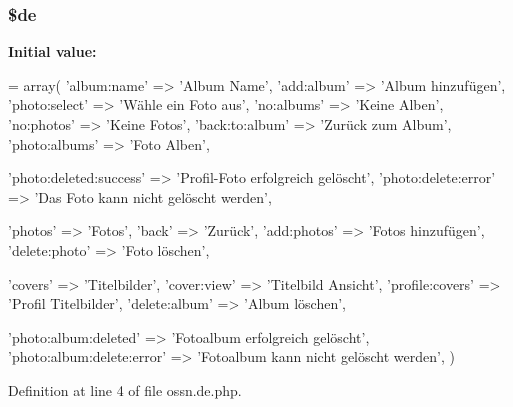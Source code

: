 \subsubsection[{\texorpdfstring{\$de}{$de}}]{\setlength{\rightskip}{0pt plus 5cm}\$de}\hypertarget{components_2_ossn_photos_2locale_2ossn_8de_8php_aab7de7e51b4580005f63dd4cf5e17311}{}\label{components_2_ossn_photos_2locale_2ossn_8de_8php_aab7de7e51b4580005f63dd4cf5e17311}
{\bfseries Initial value\+:}
\begin{DoxyCode}
= array(
    \textcolor{stringliteral}{'album:name'} => \textcolor{stringliteral}{'Album Name'},
    \textcolor{stringliteral}{'add:album'} => \textcolor{stringliteral}{'Album hinzufügen'},
    \textcolor{stringliteral}{'photo:select'} => \textcolor{stringliteral}{'Wähle ein Foto aus'},
    \textcolor{stringliteral}{'no:albums'} => \textcolor{stringliteral}{'Keine Alben'},
    \textcolor{stringliteral}{'no:photos'} => \textcolor{stringliteral}{'Keine Fotos'},
    \textcolor{stringliteral}{'back:to:album'} => \textcolor{stringliteral}{'Zurück zum Album'},
    \textcolor{stringliteral}{'photo:albums'} => \textcolor{stringliteral}{'Foto Alben'},
    
    \textcolor{stringliteral}{'photo:deleted:success'} => \textcolor{stringliteral}{'Profil-Foto erfolgreich gelöscht'},
    \textcolor{stringliteral}{'photo:delete:error'} => \textcolor{stringliteral}{'Das Foto kann nicht gelöscht werden'},
    
    \textcolor{stringliteral}{'photos'} => \textcolor{stringliteral}{'Fotos'},
    \textcolor{stringliteral}{'back'} => \textcolor{stringliteral}{'Zurück'},
    \textcolor{stringliteral}{'add:photos'} => \textcolor{stringliteral}{'Fotos hinzufügen'},
    \textcolor{stringliteral}{'delete:photo'} => \textcolor{stringliteral}{'Foto löschen'},
    
    \textcolor{stringliteral}{'covers'} => \textcolor{stringliteral}{'Titelbilder'},
    \textcolor{stringliteral}{'cover:view'} => \textcolor{stringliteral}{'Titelbild Ansicht'},
    \textcolor{stringliteral}{'profile:covers'} => \textcolor{stringliteral}{'Profil Titelbilder'},
    \textcolor{stringliteral}{'delete:album'} => \textcolor{stringliteral}{'Album löschen'},
    
    \textcolor{stringliteral}{'photo:album:deleted'} => \textcolor{stringliteral}{'Fotoalbum erfolgreich gelöscht'},
    \textcolor{stringliteral}{'photo:album:delete:error'} => \textcolor{stringliteral}{'Fotoalbum kann nicht gelöscht werden'},   
)
\end{DoxyCode}


Definition at line 4 of file ossn.\+de.\+php.

